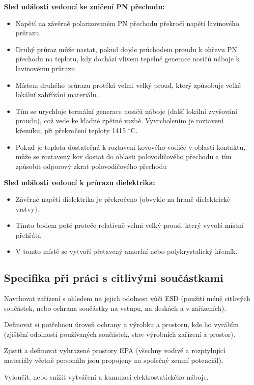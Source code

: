 \textbf{Sled událostí vedoucí ke zničení PN přechodu:}
\begin{itemize}
\item Napětí na závěrně polarizovaném PN přechodu překročí napětí lavinového průrazu.
\item Druhý průraz může nastat, pokud dojde průchodem proudu k ohřevu PN přechodu
na teplotu, kdy dochází vlivem tepelné generace nosičů náboje k lavinovému
průrazu.
\item Místem druhého průrazu protéká velmi velký proud, který způsobuje velké lokální
zahřívání materiálu.
\item Tím se urychluje termální generace nosičů náboje (další lokální zvyšování proudu),
což vede ke kladné zpětné vazbě. Vyvrcholením je roztavení křemíku, při překročení
teploty 1415 $^{\circ}$C.
\item Pokud je teplota dostatečná k roztavení kovového vodiče v oblasti kontaktu, může se roztavený kov dostat do oblasti polovodičového přechodu a tím způsobit odporový zkrat polovodičového přechodu
\end{itemize}

\textbf{Sled událostí vedoucí k průrazu dielektrika:}
\begin{itemize}
\item Závěrné napětí dielektrika je překročeno (obvykle na hraně dielektrické vrstvy).
\item Tímto bodem poté proteče relativně velmi velký proud, který vyvolá místní přehřátí.
\item V tomto místě se vytvoří přetavený amorfní nebo polykrystalický křemík.

\end{itemize}

\subsection{Specifika při práci s citlivými součástkami}
Navrhovat zařízení s ohledem na jejich odolnost vůči ESD (použití méně citlivých
součástek, nebo ochrana součástky na vstupu, na deskách a v zařízeních).

Definovat si potřebnou úroveň ochrany u výrobku a prostoru, kde ho vyrábím (zjištění
odolnosti používaných součástek, stav výrobních zařízení a prostor).

Zjistit a definovat vyhrazené prostory EPA (všechny vodivé a rozptylující materiály včetně
personálu jsou propojeny na společný zemní potenciál).

Vyloučit, nebo snížit vytváření a kumulaci elektrostatického náboje.

